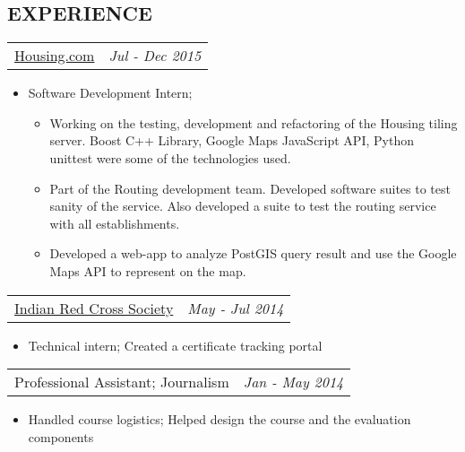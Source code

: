 \documentclass[margin]{res}
\begin{document}
\begin{resume}
\section{EXPERIENCE}      
					\begin{tabular}{p{4.2in} r} 
					\href{https://housing.com/in}{Housing.com} &  \textit{Jul - Dec 2015} 
					 \end{tabular}	
                   \begin{itemize} %
                    \item[] Software Development Intern; 
                        \begin{itemize}
                        \item Working on the testing, development and refactoring of the Housing tiling server. Boost C++ Library, Google Maps JavaScript API, Python unittest were some of the technologies used.
                        \item Part of the Routing development team. Developed software suites to test sanity of the service. Also developed a suite to test the routing service with all establishments.   
                        \item Developed a web-app to analyze PostGIS query result and use the Google Maps API to represent on the map.  
                        \end{itemize}
					 \end{itemize} 
                  \begin{tabular}{p{4.2in} r}  %
                  \href{http://www.indianredcross.org/}{Indian Red Cross Society} &  \textit{May - Jul 2014} 
                  \end{tabular}	
                   \begin{itemize} %
                    \item[] Technical intern; Created a certificate tracking portal
		   \end{itemize} 
                  \begin{tabular}{p{4.2in} r}
                  Professional Assistant; Journalism &  \textit{Jan - May 2014 }
                 \end{tabular}	
		  \begin{itemize} 
                   \item[]  Handled course logistics; Helped design the course and the evaluation components

\end{itemize}
\end{resume}
\end{document}
